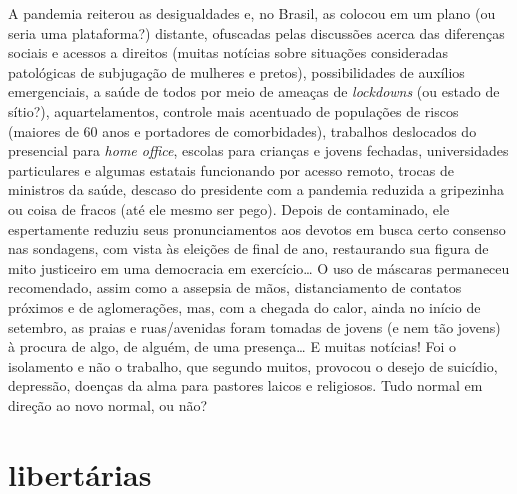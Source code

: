 A pandemia reiterou as desigualdades e, no Brasil, as colocou em um
plano (ou seria uma plataforma?) distante, ofuscadas pelas discussões
acerca das diferenças sociais e acessos a direitos (muitas notícias
sobre situações consideradas patológicas de subjugação de mulheres e
pretos), possibilidades de auxílios emergenciais, a saúde de todos por
meio de ameaças de \emph{lockdowns} (ou estado de sítio?),
aquartelamentos, controle mais acentuado de populações de riscos
(maiores de 60 anos e portadores de comorbidades), trabalhos deslocados
do presencial para \emph{home office}, escolas para crianças e jovens
fechadas, universidades particulares e algumas estatais funcionando por
acesso remoto, trocas de ministros da saúde, descaso do presidente com a
pandemia reduzida a gripezinha ou coisa de fracos (até ele mesmo ser
pego). Depois de contaminado, ele espertamente reduziu seus
pronunciamentos aos devotos em busca certo consenso nas sondagens, com
vista às eleições de final de ano, restaurando sua figura de mito
justiceiro em uma democracia em exercício\ldots{} O uso de máscaras
permaneceu recomendado, assim como a assepsia de mãos, distanciamento de
contatos próximos e de aglomerações, mas, com a chegada do calor, ainda
no início de setembro, as praias e ruas/avenidas foram tomadas de jovens
(e nem tão jovens) à procura de algo, de alguém, de uma presença\ldots{} E
muitas notícias! Foi o isolamento e não o trabalho, que segundo muitos,
provocou o desejo de suicídio, depressão, doenças da alma para pastores
laicos e religiosos. Tudo normal em direção ao novo normal, ou não?

\section{libertárias}

